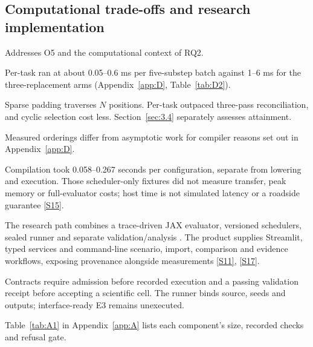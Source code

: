 \documentclass[12pt,a4paper]{article}
\begin{document}
\FloatBarrier
\subsection{Computational trade-offs and research implementation}\label{sec:3.7}

Addresses O5 and the computational context of RQ2.

Per-task ran at about 0.05--0.6 ms per five-substep batch against 1--6 ms for the three-replacement arms (Appendix~\ref{app:D}, Table~\ref{tab:D2}).

Sparse padding traverses $N$ positions. Per-task outpaced three-pass reconciliation, and cyclic selection cost less. Section~\ref{sec:3.4} separately assesses attainment.

Measured orderings differ from asymptotic work for compiler reasons set out in Appendix~\ref{app:D}.

Compilation took 0.058--0.267 seconds per configuration, separate from lowering and execution. Those scheduler-only fixtures did not measure transfer, peak memory or full-evaluator costs; host time is not simulated latency or a roadside guarantee \hyperref[source-s15]{[S15]}.

The research path combines a trace-driven JAX evaluator, versioned schedulers, sealed runner and separate validation/analysis \cite{ref36}. The product supplies Streamlit, typed services and command-line scenario, import, comparison and evidence workflows, exposing provenance alongside measurements \hyperref[source-s11]{[S11]}, \hyperref[source-s17]{[S17]}.

Contracts require admission before recorded execution and a passing validation receipt before accepting a scientific cell. The runner binds source, seeds and outputs; interface-ready E3 remains unexecuted.

Table~\ref{tab:A1} in Appendix~\ref{app:A} lists each component's size, recorded checks and refusal gate.
\end{document}
